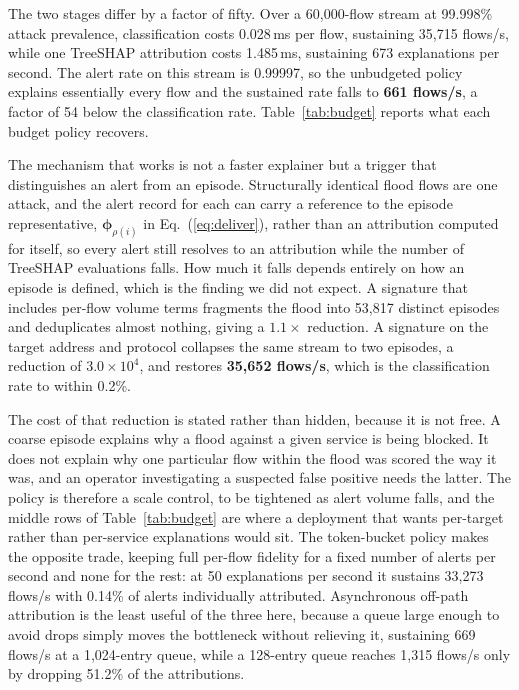 \documentclass{ieeeaccess}
\begin{document}
The two stages differ by a factor of fifty. Over a 60,000-flow stream at 99.998\%
attack prevalence, classification costs 0.028\,ms per flow, sustaining 35,715
flows/s, while one TreeSHAP attribution costs 1.485\,ms, sustaining 673
explanations per second. The alert rate on this stream is 0.99997, so the
unbudgeted policy explains essentially every flow and the sustained rate falls to
\textbf{661 flows/s}, a factor of 54 below the classification rate.
Table~\ref{tab:budget} reports what each budget policy recovers.

The mechanism that works is not a faster explainer but a trigger that
distinguishes an alert from an episode. Structurally identical flood flows are
one attack, and the alert record for each can carry a reference to the episode
representative, $\boldsymbol{\phi}_{\rho(i)}$ in Eq.~(\ref{eq:deliver}), rather
than an attribution computed for itself, so every alert still resolves to an
attribution while the number of TreeSHAP evaluations falls. How much it falls depends
entirely on how an episode is defined, which is the finding we did not expect. A
signature that includes per-flow volume terms fragments the flood into 53,817
distinct episodes and deduplicates almost nothing, giving a $1.1\times$
reduction. A signature on the target address and protocol collapses the same
stream to two episodes, a reduction of $3.0\times10^{4}$, and restores
\textbf{35,652 flows/s}, which is the classification rate to within 0.2\%.

The cost of that reduction is stated rather than hidden, because it is not free.
A coarse episode explains why a flood against a given service is being blocked.
It does not explain why one particular flow within the flood was scored the way
it was, and an operator investigating a suspected false positive needs the
latter. The policy is therefore a scale control, to be tightened as alert volume
falls, and the middle rows of Table~\ref{tab:budget} are where a deployment that
wants per-target rather than per-service explanations would sit. The token-bucket
policy makes the opposite trade, keeping full per-flow fidelity for a fixed
number of alerts per second and none for the rest: at 50 explanations per second
it sustains 33,273 flows/s with 0.14\% of alerts individually attributed.
Asynchronous off-path attribution is the least useful of the three here, because
a queue large enough to avoid drops simply moves the bottleneck without relieving
it, sustaining 669 flows/s at a 1,024-entry queue, while a 128-entry queue
reaches 1,315 flows/s only by dropping 51.2\% of the attributions.
\end{document}
